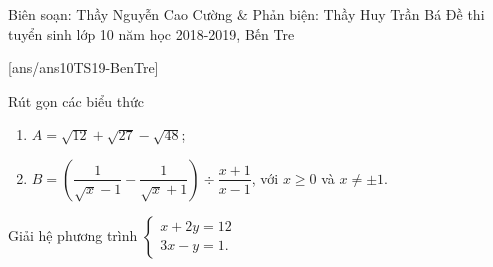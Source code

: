 \begin{name}
{Biên soạn: Thầy Nguyễn Cao Cường \& Phản biện: Thầy Huy Trần Bá}
{Đề thi tuyển sinh lớp 10 năm học 2018-2019, Bến Tre}
\end{name}

[ans/ans10TS19-BenTre]


\begin{bt}%
	Rút gọn  các biểu thức
	\begin{enumerate}
		\item $A=\sqrt{12}+\sqrt{27}-\sqrt{48}$;
		\item $B=\left(\dfrac{1}{\sqrt{x}-1}-\dfrac{1}{\sqrt{x}+1}\right)\div \dfrac{x+1}{x-1}$, với $x\geq 0$ và $x\neq \pm 1$.
	\end{enumerate}
\end{bt}


\begin{bt}%
	Giải hệ phương trình 
	$\begin{cases}
	x+2y=12\\3x-y=1.
	\end{cases}$
\end{bt}



